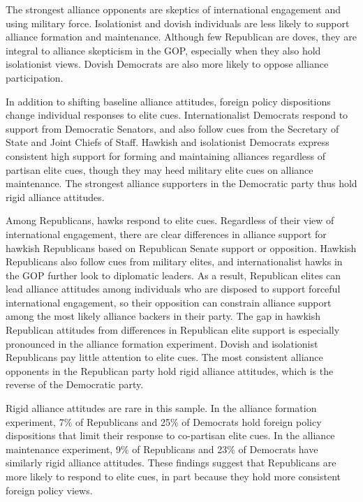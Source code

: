 \documentclass[12pt]{article}
\begin{document}
The strongest alliance opponents are skeptics of international engagement and using military force. 
Isolationist and dovish individuals are less likely to support alliance formation and maintenance. 
Although few Republican are doves, they are integral to alliance skepticism in the GOP, especially when they also hold isolationist views.
Dovish Democrats are also more likely to oppose alliance participation.  


In addition to shifting baseline alliance attitudes, foreign policy dispositions change individual responses to elite cues. 
Internationalist Democrats respond to support from Democratic Senators, and also follow cues from the Secretary of State and Joint Chiefs of Staff. 
Hawkish and isolationist Democrats express consistent high support for forming and maintaining alliances regardless of partisan elite cues, though they may heed military elite cues on alliance maintenance. 
The strongest alliance supporters in the Democratic party thus hold rigid alliance attitudes.


Among Republicans, hawks respond to elite cues. 
Regardless of their view of international engagement, there are clear differences in alliance support for hawkish Republicans based on Republican Senate support or opposition.
Hawkish Republicans also follow cues from military elites, and internationalist hawks in the GOP further look to diplomatic leaders. 
As a result, Republican elites can lead alliance attitudes among individuals who are disposed to support forceful international engagement, so their opposition can constrain alliance support among the most likely alliance backers in their party. 
The gap in hawkish Republican attitudes from differences in Republican elite support is especially pronounced in the alliance formation experiment. 
Dovish and isolationist Republicans pay little attention to elite cues. 
The most consistent alliance opponents in the Republican party hold rigid alliance attitudes, which is the reverse of the Democratic party. 


Rigid alliance attitudes are rare in this sample.
In the alliance formation experiment, 7\% of Republicans and 25\% of Democrats hold foreign policy dispositions that limit their response to co-partisan elite cues. 
In the alliance maintenance experiment, 9\% of Republicans and 23\% of Democrats have similarly rigid alliance attitudes.
These findings suggest that Republicans are more likely to respond to elite cues, in part because they hold more consistent foreign policy views.
\end{document}
